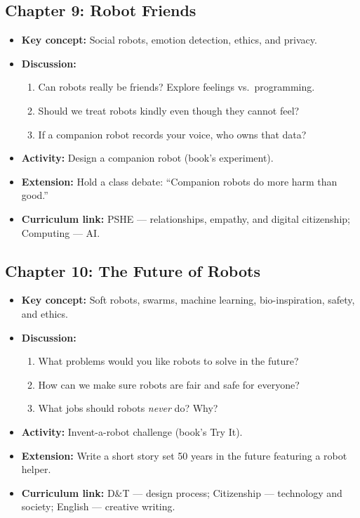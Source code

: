 \subsection*{Chapter 9: Robot Friends}
\begin{itemize}
  \item \textbf{Key concept:} Social robots, emotion detection, ethics, and privacy.
  \item \textbf{Discussion:}
    \begin{enumerate}
      \item Can robots really be friends? Explore feelings vs.\ programming.
      \item Should we treat robots kindly even though they cannot feel?
      \item If a companion robot records your voice, who owns that data?
    \end{enumerate}
  \item \textbf{Activity:} Design a companion robot (book's experiment).
  \item \textbf{Extension:} Hold a class debate: ``Companion robots do more harm than good.''
  \item \textbf{Curriculum link:} PSHE --- relationships, empathy, and digital citizenship; Computing --- AI.
\end{itemize}

\subsection*{Chapter 10: The Future of Robots}
\begin{itemize}
  \item \textbf{Key concept:} Soft robots, swarms, machine learning, bio-inspiration, safety, and ethics.
  \item \textbf{Discussion:}
    \begin{enumerate}
      \item What problems would you like robots to solve in the future?
      \item How can we make sure robots are fair and safe for everyone?
      \item What jobs should robots \emph{never} do? Why?
    \end{enumerate}
  \item \textbf{Activity:} Invent-a-robot challenge (book's Try It).
  \item \textbf{Extension:} Write a short story set 50 years in the future featuring a robot helper.
  \item \textbf{Curriculum link:} D\&T --- design process; Citizenship --- technology and society; English --- creative writing.
\end{itemize}

